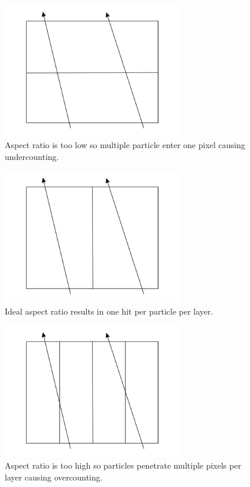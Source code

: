 \begin{figure}
  \centering
  \includegraphics[width=0.7\textwidth,keepaspectratio]{DECALStudies/fig/MAPSSaturation.jpg}
  \caption{Aspect ratio is too low so multiple particle enter one pixel causing undercounting.}
  \label{fig:lowaspectratio}
\end{figure}

\begin{figure}
  \centering
  \includegraphics[width=0.7\textwidth,keepaspectratio]{DECALStudies/fig/MAPSIdeal.jpg}
  \caption{Ideal aspect ratio results in one hit per particle per layer.}
  \label{fig:goodaspectratio}
\end{figure}

\begin{figure}
  \centering
  \includegraphics[width=0.7\textwidth,keepaspectratio]{DECALStudies/fig/MAPSBoundary.jpg}
  \caption{Aspect ratio is too high so particles penetrate multiple pixels per layer causing overcounting.}
  \label{fig:highaspectratio}
\end{figure}

